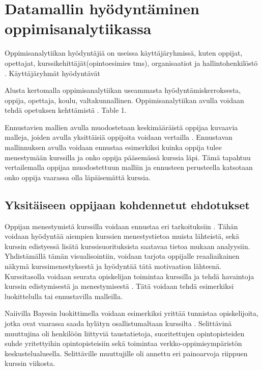 \chapter{Datamallin hyödyntäminen oppimisanalytiikassa\label{hyodyntaminen}}

Oppimisanalytiikan hyödyntäjiä on useissa käyttäjäryhmissä, kuten oppijat, opettajat, kurssikehittäjät(opintoesimies tms), organisaatiot ja hallintohenkilöstö \citep{romeroEducationalDataMining2010}. Käyttäjäryhmät hyödyntävät

\color{red} Alusta kertomalla oppimisanalytiikan useammasta hyödyntämiskerroksesta, oppija, opettaja, koulu, valtakunnallinen. Oppimisanalytiikan avulla voidaan tehdä opetuksen kehttämistä \citep{romeroEducationalDataMining2010}. Table 1. \color{black}

Ennustavien mallien avulla muodostetaan keskimääräistä oppijaa kuvaavia malleja, joiden avulla yksittäisiä oppijoita voidaan vertailla \citep{wolffImprovingRetentionPredicting2013}. Ennustavan mallinnuksen avulla voidaan ennustaa esimerkiksi kuinka oppija tulee menestymään kurssilla ja onko oppija pääsemässä kurssia läpi. Tämä tapahtuu vertailemalla oppijaa muodostettuun malliin ja ennusteen perusteella katsotaan onko oppija vaarassa olla läpäisemättä kurssia.

\section{Yksitäiseen oppijaan kohdennetut ehdotukset}

\color{blue}
Oppijan menestymistä kurssilla voidaan ennustaa eri tarkoituksiin \citep{barberCourseCorrectionUsing2012a}. Tähän voidaan hyödyntää aiempien kurssien menestystietoa muista lähteistä, sekä kurssin edistyessä lisätä kurssisuorituksista saatavaa tietoa mukaan analyysiin. Yhdistämällä tämän visualisointiin, voidaan tarjota oppijalle reaaliaikainen näkymä kurssimenestyksestä ja hyödyntää tätä motivaation lähteenä. Kurssitasolla voidaan seurata opiskelijan toimintaa kurssilla ja tehdä havaintoja kurssin edistymisestä ja menestymisestä \citep{longPenetratingFogAnalytics2011,siemensLearningAnalyticsEmergence2013}. Tätä voidaan tehdä esimerkiksi luokittelulla tai ennustavilla malleilla.

Naiivilla Bayesin luokittimella voidaan esimerkiksi yrittää tunnistaa opiskelijoita, jotka ovat vaarassa saada hylätyn osallistumaltaan kurssilta \citep{barberCourseCorrectionUsing2012}. Selittävinä muuttujina oli henkilöön liittyviä taustatietoja, suoritettujen opintopisteiden suhde yritettyihin opintopisteisiin sekä toimintaa verkko-oppimisympäristön keskustelualueella. Selittäville muuttujille oli annettu eri painoarvoja riippuen kurssin viikosta.


